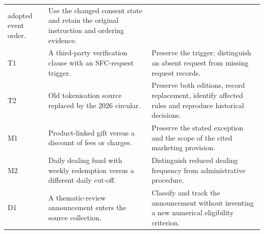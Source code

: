\begin{longtable}{P{0.09\textwidth}P{0.41\textwidth}P{0.4\textwidth}}
adopted event order. & Use the changed consent state and retain the original
instruction and ordering evidence.\\
T1 & A third-party verification clause with an SFC-request trigger. & Preserve the
trigger; distinguish an absent request from missing request records.\\
T2 & Old tokenisation source replaced by the 2026 circular. & Preserve both editions,
record replacement, identify affected rules and reproduce historical decisions.\\
M1 & Product-linked gift versus a discount of fees or charges. & Preserve the stated
exception and the scope of the cited marketing provision.\\
M2 & Daily dealing fund with weekly redemption versus a different daily cut-off. &
Distinguish reduced dealing frequency from administrative procedure.\\
D1 & A thematic-review announcement enters the source collection. & Classify and
track the announcement without inventing a new numerical eligibility criterion.\\
\bottomrule
\end{longtable}
\endgroup


